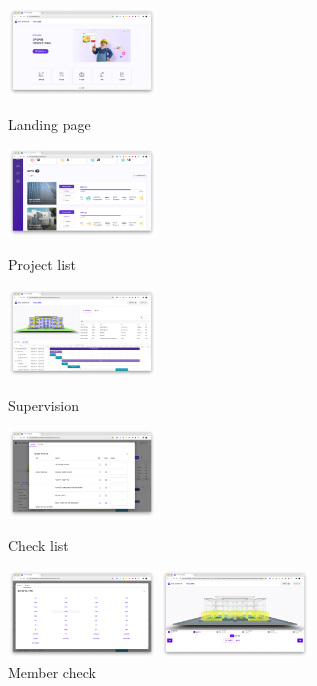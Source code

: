 \begin{figure}[!ht]
	\begin{fullwidth}
		\parbox{0.35\textwidth}{
			\centering
			\includegraphics[width=0.35\textwidth]{images/builderhub-supervision-landing-1.png}
			\caption*{Landing page}
		}\qquad
		\parbox{0.35\textwidth}{
			\centering
			\includegraphics[width=0.35\textwidth]{images/builderhub-supervision-project-list.png}
			\caption*{Project list}
		}\qquad
		\parbox{0.35\textwidth}{
			\centering
			\includegraphics[width=0.35\textwidth]{images/builderhub-supervision-main-1.png}
			\caption*{Supervision}
		}\qquad
		\parbox{0.35\textwidth}{
			\centering
			\includegraphics[width=0.35\textwidth]{images/builderhub-supervision-checklist.png}
			\caption*{Check list}
		}
		\parbox{0.35\textwidth}{
			\centering
			\includegraphics[width=0.35\textwidth]{images/builderhub-supervision-check-member.png}
			\caption*{Member check}
		}\qquad
		\parbox{0.35\textwidth}{
			\centering
			\includegraphics[width=0.35\textwidth]{images/builderhub-supervision-asec.png}
}
\end{fullwidth}
\end{figure}
